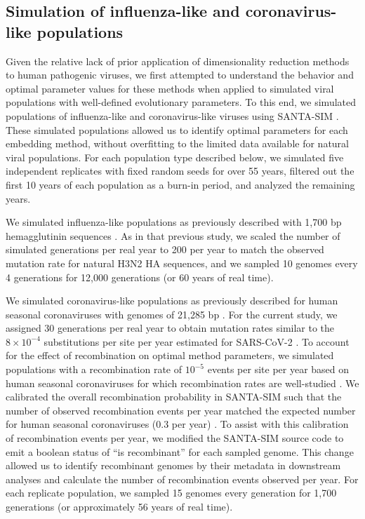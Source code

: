 \documentclass[10pt,letterpaper]{article}
\begin{document}
\subsection*{Simulation of influenza-like and coronavirus-like populations}

Given the relative lack of prior application of dimensionality reduction methods to human pathogenic viruses, we first attempted to understand the behavior and optimal parameter values for these methods when applied to simulated viral populations with well-defined evolutionary parameters.
To this end, we simulated populations of influenza-like and coronavirus-like viruses using SANTA-SIM \cite{Jariani2019}.
These simulated populations allowed us to identify optimal parameters for each embedding method, without overfitting to the limited data available for natural viral populations.
For each population type described below, we simulated five independent replicates with fixed random seeds for over 55 years, filtered out the first 10 years of each population as a burn-in period, and analyzed the remaining years.

We simulated influenza-like populations as previously described with 1,700 bp hemagglutinin sequences \cite{Huddleston2020}.
As in that previous study, we scaled the number of simulated generations per real year to 200 per year to match the observed mutation rate for natural H3N2 HA sequences, and we sampled 10 genomes every 4 generations for 12,000 generations (or 60 years of real time).

We simulated coronavirus-like populations as previously described for human seasonal coronaviruses with genomes of 21,285 bp \cite{Muller2022}.
For the current study, we assigned 30 generations per real year to obtain mutation rates similar to the $8 \times 10^{-4}$ substitutions per site per year estimated for SARS-CoV-2 \cite{Rambaut2020}.
To account for the effect of recombination on optimal method parameters, we simulated populations with a recombination rate of $10^{-5}$ events per site per year based on human seasonal coronaviruses for which recombination rates are well-studied \cite{Muller2022,Carabelli2023}.
We calibrated the overall recombination probability in SANTA-SIM such that the number of observed recombination events per year matched the expected number for human seasonal coronaviruses (0.3 per year) \cite{Muller2022}.
To assist with this calibration of recombination events per year, we modified the SANTA-SIM source code to emit a boolean status of ``is recombinant'' for each sampled genome.
This change allowed us to identify recombinant genomes by their metadata in downstream analyses and calculate the number of recombination events observed per year.
For each replicate population, we sampled 15 genomes every generation for 1,700 generations (or approximately 56 years of real time).
\end{document}
